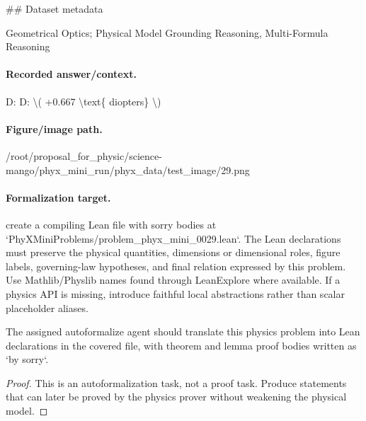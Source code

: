 \#\# Dataset metadata

Geometrical Optics; Physical Model Grounding Reasoning, Multi-Formula Reasoning

\paragraph{Recorded answer/context.}
D: D: \textbackslash{}( +0.667 \textbackslash{}text\{ diopters\} \textbackslash{})

\paragraph{Figure/image path.}
/root/proposal\_for\_physic/science-mango/phyx\_mini\_run/phyx\_data/test\_image/29.png

\paragraph{Formalization target.}
create a compiling Lean file with sorry bodies at `PhyXMiniProblems/problem\_phyx\_mini\_0029.lean`. The Lean declarations must preserve the physical quantities, dimensions or dimensional roles, figure labels, governing-law hypotheses, and final relation expressed by this problem.
Use Mathlib/Physlib names found through LeanExplore where available. If a physics API is missing, introduce faithful local abstractions rather than scalar placeholder aliases.

\begin{theorem}
\label{thm:physics:phyx_mini_0029:target}
The assigned autoformalize agent should translate this physics problem into Lean declarations in the covered file, with theorem and lemma proof bodies written as `by sorry`.
\end{theorem}
\begin{proof}
This is an autoformalization task, not a proof task. Produce statements that can later be proved by the physics prover without weakening the physical model.
\end{proof}

